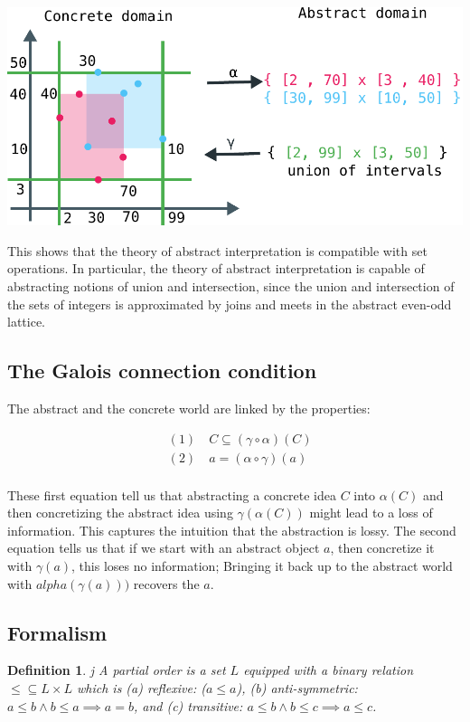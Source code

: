 \documentclass[11pt]{book}
\newtheorem{definition}[theorem]{Definition}
\begin{document}
\includegraphics[width=\textwidth]{./union.pdf}

This shows that the theory of abstract interpretation is compatible with set
operations. In particular, the theory of abstract interpretation is capable of
abstracting notions of union and intersection, since the union and intersection
of the sets of integers is approximated by joins and meets in the abstract even-odd
lattice.


\subsection{The Galois connection condition}

The abstract and the concrete world are linked by the properties:

\begin{align*}
    &(1) \quad C \subseteq (\gamma\circ \alpha)(C) \\
    &(2) \quad a = (\alpha \circ \gamma)(a) \\
\end{align*}

These first equation tell us that abstracting a concrete idea $C$ into
$\alpha(C)$ and then concretizing the abstract idea using $\gamma(\alpha(C))$
might lead to a loss of information. This captures the intuition that the abstraction
is lossy. The second equation tells us that if we start with an abstract object
$a$, then concretize it with $\gamma(a)$, this loses no information; Bringing
it back up to the abstract world with $alpha(\gamma(a)))$ recovers the $a$.

\subsection{Formalism}

\begin{definition}j
A partial order is a set $L$ equipped with a binary relation $\leq \subseteq L
\times L$ which is (a) reflexive: ($a \leq a$), (b) anti-symmetric: $a \leq b
\land b \leq a \implies a = b$, and (c) transitive: $a \leq b \land b \leq c
\implies a \leq c$.
\end{definition}
\end{document}

